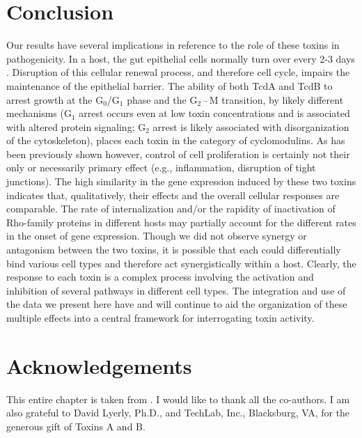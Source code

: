 \section{Conclusion}
Our results have several implications in reference to the 
role of these toxins in pathogenicity. In a host, the gut 
epithelial cells normally turn over every 2-3 days 
\cite{Kim:2010ja}. Disruption of this cellular renewal 
process, and therefore cell cycle, impairs the 
maintenance of the epithelial barrier. The ability of 
both TcdA and TcdB to arrest growth at the 
G$_{\text{0}}$/G$_{\text{1}}$ phase and the 
G$_{\text{2}}$\,--\,M transition, by likely different 
mechanisms (G$_{\text{1}}$ arrest occurs even at low 
toxin concentrations and is associated with altered 
protein signaling; G$_{\text{2}}$ arrest is likely 
associated with disorganization of the cytoskeleton), 
places each toxin in the category of cyclomodulins. 
As has been previously shown however, control of 
cell proliferation is certainly not their only or 
necessarily primary effect (e.g., inflammation, 
disruption of tight junctions). The high similarity 
in the gene expression induced by these two toxins 
indicates that, qualitatively, their effects and 
the overall cellular responses are comparable. The 
rate of internalization and/or the rapidity of 
inactivation of Rho-family proteins in different 
hosts may partially account for the different 
rates in the onset of gene expression. Though we did 
not observe synergy or antagonism between the two 
toxins, it is possible that each could differentially 
bind various cell types and therefore act synergistically 
within a host. Clearly, the response to each toxin 
is a complex process involving the activation and 
inhibition of several pathways in different cell 
types. The integration and use of the data we present 
here have and will continue to aid the organization 
of these multiple effects into a central framework 
for interrogating toxin activity.

\section{Acknowledgements}
This entire chapter is taken from 
.
I would like to thank all the co-authors. I am
also  grateful to David Lyerly, Ph.D., and 
TechLab, Inc., Blacksburg, VA, for the generous gift 
of Toxins A and B.









